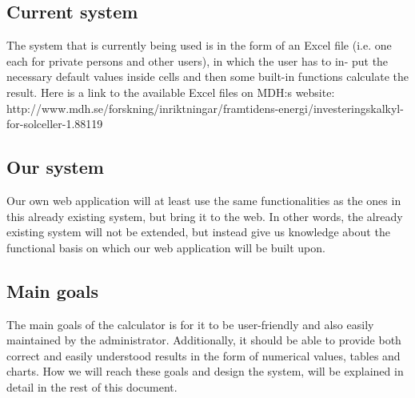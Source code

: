 \documentclass[]{article}
\begin{document}
\subsection{Current system}
The system that is currently being used is in the form of an Excel file (i.e.
one each for private persons and other users), in which the user has to in-
put the necessary default values inside cells and then some built-in functions
calculate the result. Here is a link to the available Excel files on MDH:s website:
http://www.mdh.se/forskning/inriktningar/framtidens-energi/investeringskalkyl-
for-solceller-1.88119
\subsection{Our system}
Our own web application will at least use the same functionalities as the ones
in this already existing system, but bring it to the web. In other words, the
already existing system will not be extended, but instead give us knowledge
about the functional basis on which our web application will be built upon. 

\subsection{Main goals}
The main goals of the calculator is for it to be user-friendly and also easily maintained
by the administrator. Additionally, it should be able to provide both correct and
easily understood results in the form of numerical values, tables and charts. How we will reach these goals and design the system, will be explained in detail in the rest of this document.
\end{document}
